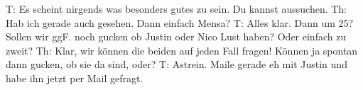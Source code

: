 T: Es scheint nirgends was besonders gutes zu sein. Du kannst aussuchen.
Th: Hab ich gerade auch gesehen. Dann einfach Mensa? 
T: Alles klar. Dann um 25? Sollen wir ggF. noch gucken ob Justin oder Nico Lust haben? Oder einfach zu zweit?
Th: Klar, wir können die beiden auf jeden Fall fragen! Können ja spontan dann gucken, ob sie da sind, oder? 
T: Astrein. Maile gerade eh mit Justin und habe ihn jetzt per Mail gefragt. 
